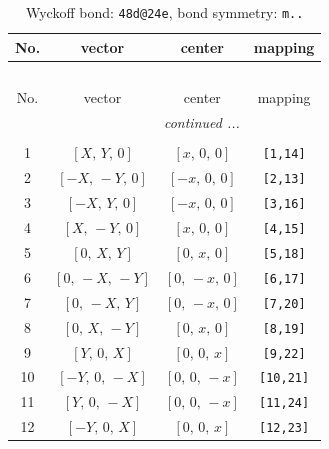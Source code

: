\documentclass[fleqn,8pt]{jsarticle}
\begin{document}
\begin{longtable}{cccc}
\caption{Wyckoff bond: {\tt 48d@24e}, bond symmetry: {\tt m..}}
 \\
 \hline \hline
No. & vector & center & mapping \\ \hline \endfirsthead

\multicolumn{3}{l}{\tablename\ \thetable{}} \\
 \hline \hline
No. & vector & center & mapping \\ \hline \endhead

 \hline \hline
\multicolumn{3}{r}{\footnotesize\it continued ...} \\ \endfoot

 \hline \hline
\multicolumn{3}{r}{} \\ \endlastfoot

1 & $\left[ X,\, Y,\, 0 \right]$ & $\left[ x,\, 0,\, 0 \right]$ & {\tt [1,14]} \\ \hline
2 & $\left[ - X,\, - Y,\, 0 \right]$ & $\left[ - x,\, 0,\, 0 \right]$ & {\tt [2,13]} \\ \hline
3 & $\left[ - X,\, Y,\, 0 \right]$ & $\left[ - x,\, 0,\, 0 \right]$ & {\tt [3,16]} \\ \hline
4 & $\left[ X,\, - Y,\, 0 \right]$ & $\left[ x,\, 0,\, 0 \right]$ & {\tt [4,15]} \\ \hline
5 & $\left[ 0,\, X,\, Y \right]$ & $\left[ 0,\, x,\, 0 \right]$ & {\tt [5,18]} \\ \hline
6 & $\left[ 0,\, - X,\, - Y \right]$ & $\left[ 0,\, - x,\, 0 \right]$ & {\tt [6,17]} \\ \hline
7 & $\left[ 0,\, - X,\, Y \right]$ & $\left[ 0,\, - x,\, 0 \right]$ & {\tt [7,20]} \\ \hline
8 & $\left[ 0,\, X,\, - Y \right]$ & $\left[ 0,\, x,\, 0 \right]$ & {\tt [8,19]} \\ \hline
9 & $\left[ Y,\, 0,\, X \right]$ & $\left[ 0,\, 0,\, x \right]$ & {\tt [9,22]} \\ \hline
10 & $\left[ - Y,\, 0,\, - X \right]$ & $\left[ 0,\, 0,\, - x \right]$ & {\tt [10,21]} \\ \hline
11 & $\left[ Y,\, 0,\, - X \right]$ & $\left[ 0,\, 0,\, - x \right]$ & {\tt [11,24]} \\ \hline
12 & $\left[ - Y,\, 0,\, X \right]$ & $\left[ 0,\, 0,\, x \right]$ & {\tt [12,23]} \\
\end{longtable}
\renewcommand{\arraystretch}{1.2}
\end{document}
